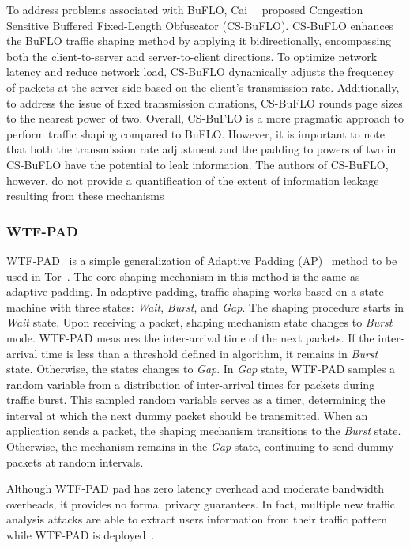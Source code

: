 To address problems associated with BuFLO, Cai~\etal~\cite{cai2014cs} proposed Congestion Sensitive Buffered Fixed-Length Obfuscator (CS-BuFLO).
CS-BuFLO enhances the BuFLO traffic shaping method by applying it bidirectionally, encompassing both the client-to-server and server-to-client directions. 
To optimize network latency and reduce network load, CS-BuFLO dynamically adjusts the frequency of packets at the server side based on the client's transmission rate.
Additionally, to address the issue of fixed transmission durations, CS-BuFLO rounds page sizes to the nearest power of two. 
Overall, CS-BuFLO is a more pragmatic approach to perform traffic shaping compared to BuFLO. 
However, it is important to note that both the transmission rate adjustment and the padding to powers of two in CS-BuFLO have the potential to leak information.
The authors of CS-BuFLO, however, do not provide a quantification of the extent of information leakage resulting from these mechanisms






\subsubsection{WTF-PAD}\label{subsubsec:wtf-pad}
WTF-PAD~\cite{juarez2016toward} is a simple generalization of Adaptive Padding (AP)~\cite{shmatikov2006timing} method to be used in Tor~\cite{dingledine2004tor}. 
The core shaping mechanism in this method is the same as adaptive padding. 
In adaptive padding, traffic shaping works based on a state machine with three states: \textit{Wait}, \textit{Burst}, and \textit{Gap}. 
The shaping procedure starts in \textit{Wait} state. 
Upon receiving a packet, shaping mechanism state changes to \textit{Burst} mode. 
WTF-PAD measures the inter-arrival time of the next packets. 
If the inter-arrival time is less than a threshold defined in algorithm, it remains in \textit{Burst} state. Otherwise, the states changes to \textit{Gap}.
In \textit{Gap} state, WTF-PAD samples a random variable from a distribution of inter-arrival times for packets during traffic burst.
This sampled random variable serves as a timer, determining the interval at which the next dummy packet should be transmitted.
When an application sends a packet, the shaping mechanism transitions to the \textit{Burst} state. Otherwise, the mechanism remains in the \textit{Gap} state, continuing to send dummy packets at random intervals. 

Although WTF-PAD pad has zero latency overhead and moderate bandwidth overheads, it provides no formal privacy guarantees.
In fact, multiple new traffic analysis attacks are able to extract users information from their traffic pattern while WTF-PAD is deployed~\cite{sirinam2018df}.


